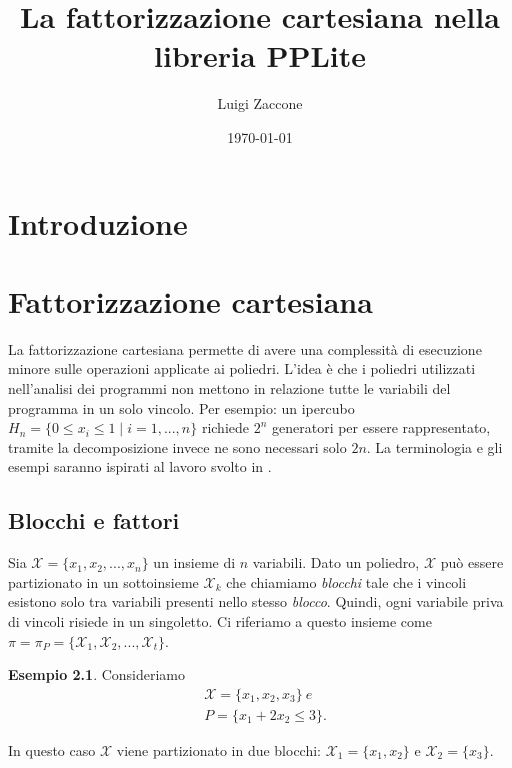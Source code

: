 \documentclass{mimosis}
\author{Luigi Zaccone}
\date{\today}
\title{La fattorizzazione cartesiana nella libreria PPLite}
\theoremstyle{definition}
\newtheorem{exmp}{Esempio}[section]
\begin{document}
\maketitle
\tableofcontents



\chapter{Introduzione}
\label{sec:orga216e26}

\chapter{Fattorizzazione cartesiana}
\label{sec:org137d6d0}
La fattorizzazione cartesiana permette di avere una complessità di esecuzione
minore sulle operazioni applicate ai poliedri. L'idea è che i poliedri
utilizzati nell'analisi dei programmi non mettono in relazione tutte le
variabili del programma in un solo vincolo. Per esempio: un ipercubo \\
\(H_n = \{0 \le x_i \le 1 \; | \; i = 1,...,n\}\)
richiede \(2^n\) generatori per essere rappresentato, tramite la decomposizione
invece ne sono necessari solo \(2n\). La terminologia e gli esempi saranno
ispirati al lavoro svolto in \cite{fastpoly}.

\section{Blocchi e fattori}
\label{sec:orgd454245}
Sia \(\mathcal{X} = \{x_1, x_2,..., x_n\}\) un insieme di \(n\) variabili. Dato un poliedro, \(\mathcal{X}\)
può essere partizionato in un sottoinsieme \(\mathcal{X}_k\) che chiamiamo \emph{blocchi} tale
che i vincoli esistono solo tra variabili presenti nello stesso \emph{blocco}.
Quindi, ogni variabile priva di vincoli risiede in un singoletto. Ci riferiamo a
questo insieme come \(\pi = \pi_P = \{\mathcal{X}_1, \mathcal{X}_2,..., \mathcal{X}_t\}\).

\begin{exmp}
Consideriamo
\begin{align*}
  &\mathcal{X} = \{x_1, x_2, x_3\} ~{}e \\
  &P = \{x_1 + 2x_2 \le 3\}.
\end{align*}

In questo caso $\mathcal{X}$ viene partizionato in due blocchi: $\mathcal{X}_1 = \{x_1, x_2\}$ e
$\mathcal{X}_2 = \{x_3\}$.
\end{exmp}
\end{document}
